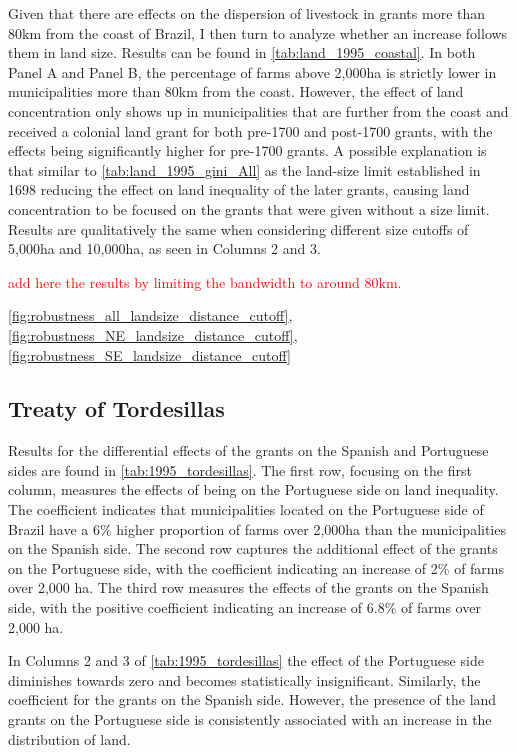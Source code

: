 \documentclass[11pt]{article}
\newcommand{\red}[1]{\textcolor{red}{#1}}
\begin{document}
Given that there are effects on the dispersion of livestock in grants more than 80km from the coast of Brazil, I then turn to analyze whether an increase follows them in land size.
Results can be found in \autoref{tab:land_1995_coastal}.
In both Panel A and Panel B, the percentage of farms above 2,000ha is strictly lower in municipalities more than 80km from the coast. 
However, the effect of land concentration only shows up in municipalities that are further from the coast and received a colonial land grant for both pre-1700 and post-1700 grants, with the effects being significantly higher for pre-1700 grants.
A possible explanation is that similar to \autoref{tab:land_1995_gini_All} as the land-size limit established in 1698 reducing the effect on land inequality of the later grants, causing land concentration to be focused on the grants that were given without a size limit.
Results are qualitatively the same when considering different size cutoffs of 5,000ha and 10,000ha, as seen in Columns 2 and 3.

\red{add here the results by limiting the bandwidth to around 80km.}

\autoref{fig:robustness_all_landsize_distance_cutoff},
\autoref{fig:robustness_NE_landsize_distance_cutoff}, 
\autoref{fig:robustness_SE_landsize_distance_cutoff}

\subsection{Treaty of Tordesillas}

Results for the differential effects of the grants on the Spanish and Portuguese sides are found in \autoref{tab:1995_tordesillas}.
The first row, focusing on the first column, measures the effects of being on the Portuguese side on land inequality. 
The coefficient indicates that municipalities located on the Portuguese side of Brazil have a 6\% higher proportion of farms over 2,000ha than the municipalities on the Spanish side.
The second row captures the additional effect of the grants on the Portuguese side, with the coefficient indicating an increase of 2\% of farms over 2,000 ha.
The third row measures the effects of the grants on the Spanish side, with the positive coefficient indicating an increase of 6.8\% of farms over 2,000 ha. 

In Columns 2 and 3 of \autoref{tab:1995_tordesillas} the effect of the Portuguese side diminishes towards zero and becomes statistically insignificant. 
Similarly, the coefficient for the grants on the Spanish side. 
However, the presence of the land grants on the Portuguese side is consistently associated with an increase in the distribution of land.
\end{document}
